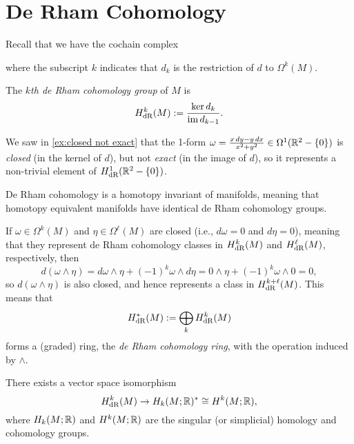 
\section{De Rham Cohomology}
\label{sec:de Rham}

Recall that we have the cochain complex
	\begin{center}
	\end{center}
where the subscript $k$ indicates that $d_k$ is the restriction of $d$ to $\Omega^k(M)$.

\begin{definition}\label{def:de Rham cohomology}
	The \emph{$k$th de Rham cohomology group} of $M$ is
	\[
		H_{\text{dR}}^k(M) := \frac{\ker d_k}{\operatorname{im} d_{k-1}}.
	\]
\end{definition}

\begin{example}\label{ex:closed not exact 2}
	We saw in \cref{ex:closed not exact} that the 1-form $\omega = \frac{x\, dy - y\, dx}{x^2 + y^2} \in \Omega^1(\mathbb{R}^2 -\{0\})$ is \emph{closed} (in the kernel of $d$), but not \emph{exact} (in the image of $d$), so it represents a non-trivial element of $H_{\text{dR}}^1(\mathbb{R}^2 - \{0\})$.
\end{example}

De Rham cohomology is a homotopy invariant of manifolds, meaning that homotopy equivalent manifolds have identical de Rham cohomology groups. 

If $\omega \in \Omega^k(M)$ and $\eta \in \Omega^\ell(M)$ are closed (i.e., $d \omega = 0$ and $d\eta = 0$), meaning that they represent de Rham cohomology classes in $H_{\text{dR}}^k(M)$ and  $H_{\text{dR}}^\ell(M)$, respectively, then
\[
	d(\omega \wedge \eta) = d\omega \wedge \eta + (-1)^k \omega \wedge d\eta = 0 \wedge \eta + (-1)^k \omega \wedge 0 = 0,
\]
so $d(\omega \wedge \eta)$ is also closed, and hence represents a class in $H_{\text{dR}}^{k+\ell}(M)$. This means that
\[
	H_{\text{dR}}^\ast(M) := \bigoplus_k H_{\text{dR}}^k(M)
\]
forms a (graded) ring, the \emph{de Rham cohomology ring}, with the operation induced by $\wedge$.

\begin{theorem}\label{thm:de Rham}
	There exists a vector space isomorphism
	\[
		H_{\text{dR}}^k(M) \to H_k(M;\mathbb{R})^\ast \cong H^k(M;\mathbb{R}),
	\]
	where $H_k(M;\mathbb{R})$ and $H^k(M;\mathbb{R})$ are the singular (or simplicial) homology and cohomology groups.
\end{theorem}

